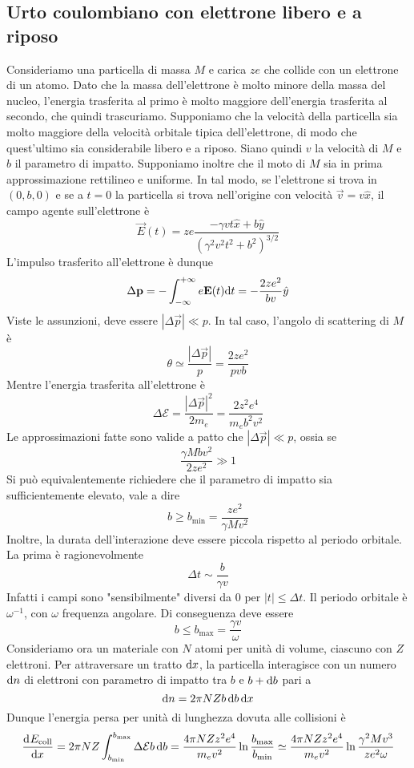 \documentclass{article}
\begin{document}
\subsection{Urto coulombiano con elettrone libero e a riposo}
Consideriamo una particella di massa $M$ e carica $ze$ che collide con un elettrone di un atomo. Dato che la massa dell'elettrone è molto minore della massa del nucleo, l'energia trasferita al primo è molto maggiore dell'energia trasferita al secondo, che quindi trascuriamo. Supponiamo che la velocità della particella sia molto maggiore della velocità orbitale tipica dell'elettrone, di modo che quest'ultimo sia considerabile libero e a riposo. Siano quindi $v$ la velocità di $M$ e $b$ il parametro di impatto. Supponiamo inoltre che il moto di $M$ sia in prima approssimazione rettilineo e uniforme. In tal modo, se l'elettrone si trova in $(0,b,0)$ e se a $t=0$ la particella si trova nell'origine con velocità $\vec{v}=v\hat{x}$, il campo agente sull'elettrone è
\[\vec{E}(t)=ze\frac{-\gamma vt\hat{x}+b\hat{y}}{(\gamma^2v^2t^2+b^2)^{3/2}}\]
L'impulso trasferito all'elettrone è dunque
\[\Delta\mathbf{p}=-\int_{-\infty}^{+\infty}e\mathbf{E}(t)\mathrm{d} t=-\frac{2ze^2}{b v}\hat{y}\]
Viste le assunzioni, deve essere $|\Delta\vec{p}|\ll p$. In tal caso, l'angolo di scattering di $M$ è
\[\theta\simeq\frac{|\Delta\vec{p}|}{p}=\frac{2ze^2}{pvb}\]
Mentre l'energia trasferita all'elettrone è
\[\Delta \mathcal{E}=\frac{|\Delta\vec{p}|^2}{2m_e}=\frac{2z^2e^4}{m_eb^2v^2}\]
Le approssimazioni fatte sono valide a patto che $|\Delta \vec{p}|\ll p$, ossia se
\[\frac{\gamma Mbv^2}{2ze^2}\gg 1\]
Si può equivalentemente richiedere che il parametro di impatto sia sufficientemente elevato, vale a dire
\[b\geq b_\textrm{min}=\frac{ze^2}{\gamma Mv^2}\]
Inoltre, la durata dell'interazione deve essere piccola rispetto al periodo orbitale. La prima è ragionevolmente
\[\Delta t\sim\frac{b}{\gamma v}\]
Infatti i campi sono "sensibilmente" diversi da 0 per $|t|\leq\Delta t$. Il periodo orbitale è $\omega^{-1}$, con $\omega$ frequenza angolare. Di conseguenza deve essere
\[b\leq b_\textrm{max}=\frac{\gamma v}{\omega}\]
Consideriamo ora un materiale con $N$ atomi per unità di volume, ciascuno con $Z$ elettroni. Per attraversare un tratto $\mathrm{d} x$, la particella interagisce con un numero $\mathrm{d} n$ di elettroni con parametro di impatto tra $b$ e $b+\mathrm{d} b$ pari a
\[\mathrm{d} n=2\pi NZb\,\mathrm{d} b\,\mathrm{d} x\]
Dunque l'energia persa per unità di lunghezza dovuta alle collisioni è
\[\dfrac{\mathrm{d} ^{}E_\textrm{coll}}{\mathrm{d} {x}^{}}=2\pi NZ\int_{b_\textrm{min}}^{b_\textrm{max}}\Delta \mathcal{E} b\,\mathrm{d} b=\frac{4\pi NZz^2e^4}{m_ev^2}\ln\frac{b_\textrm{max}}{b_\textrm{min}}\simeq\frac{4\pi NZz^2e^4}{m_ev^2}\ln\frac{\gamma^2M v^3}{ze^2\omega}\]
\end{document}
